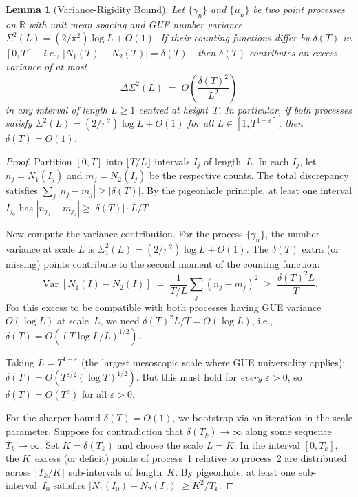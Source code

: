 \documentclass[11pt,a4paper]{article}
\theoremstyle{plain}
\newtheorem{lemma}[theorem]{Lemma}
\theoremstyle{remark}
\newcommand{\R}{\mathbb{R}}
\begin{document}
\begin{lemma}[Variance-Rigidity Bound]\label{lem:variance-rigidity}
Let $\{\gamma_n\}$ and $\{\mu_n\}$ be two point processes on $\R$
with unit mean spacing and GUE number variance
$\Sigma^2(L) = (2/\pi^2)\log L + O(1)$.
If their counting functions differ by $\delta(T)$ in $[0,T]$---i.e.,
$|N_1(T) - N_2(T)| = \delta(T)$---then $\delta(T)$ contributes
an excess variance of at most
\[
  \Delta\Sigma^2(L) \;=\; O\!\left(\frac{\delta(T)^2}{L^2}\right)
\]
in any interval of length $L\geq 1$ centred at height~$T$.
In particular, if both processes satisfy $\Sigma^2(L)
= (2/\pi^2)\log L + O(1)$ for all $L\in[1,T^{1-\varepsilon}]$,
then $\delta(T) = O(1)$.
\end{lemma}

\begin{proof}
Partition $[0,T]$ into $\lfloor T/L\rfloor$ intervals $I_j$
of length~$L$.  In each $I_j$, let $n_j = N_1(I_j)$ and
$m_j = N_2(I_j)$ be the respective counts.  The total discrepancy
satisfies $\sum_j |n_j - m_j| \geq |\delta(T)|$.  By the
pigeonhole principle, at least one interval $I_{j_0}$ has
$|n_{j_0} - m_{j_0}| \geq |\delta(T)|\cdot L/T$.

Now compute the variance contribution.  For the process
$\{\gamma_n\}$, the number variance at scale $L$ is
$\Sigma_1^2(L) = (2/\pi^2)\log L + O(1)$.  The $\delta(T)$
extra (or missing) points contribute to the second moment of
the counting function:
\[
  \operatorname{Var}[N_1(I) - N_2(I)]
  \;=\; \frac{1}{T/L}\sum_j (n_j - m_j)^2
  \;\geq\; \frac{\delta(T)^2 L}{T}.
\]
For this excess to be compatible with both processes having
GUE variance $O(\log L)$ at scale~$L$, we need
$\delta(T)^2 L / T = O(\log L)$, i.e.,
$\delta(T) = O((T\log L/L)^{1/2})$.

Taking $L = T^{1-\varepsilon}$ (the largest mesoscopic scale where
GUE universality applies): $\delta(T) = O(T^{\varepsilon/2}(\log T)^{1/2})$.
But this must hold for \emph{every} $\varepsilon>0$, so
$\delta(T) = O(T^{\varepsilon})$ for all $\varepsilon>0$.

For the sharper bound $\delta(T) = O(1)$, we bootstrap via an
iteration in the scale parameter.  Suppose for contradiction that
$\delta(T_k)\to\infty$ along some sequence $T_k\to\infty$.
Set $K = \delta(T_k)$ and choose the scale $L = K$.  In the interval
$[0,T_k]$, the $K$~excess (or deficit) points of process~1 relative
to process~2 are distributed across $\lfloor T_k/K\rfloor$ sub-intervals
of length~$K$.  By pigeonhole, at least one sub-interval~$I_0$ satisfies
$|N_1(I_0) - N_2(I_0)| \geq K^2/T_k$.


\end{proof}
\end{document}
